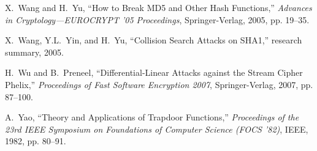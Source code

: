 \documentclass[11pt,twoside]{article}
\begin{document}
{\begin{thebibliography}{19}
 X.~Wang and H.~Yu, ``How to Break MD5 and Other Hash Functions,'' {\it Advances in Cryptology---EUROCRYPT '05 Proceedings}, Springer-Verlag, 2005, pp. 19--35.

 X.~Wang, Y.L.~Yin, and H.~Yu, ``Collision Search Attacks on SHA1,'' research summary, 2005.

 H.~Wu and B.~Preneel, ``Differential-Linear Attacks against the Stream Cipher Phelix,'' {\it Proceedings of Fast Software Encryption 2007}, Springer-Verlag, 2007, pp. 87--100.

  A.~Yao, ``Theory and Applications of Trapdoor Functions,'' {\it Proceedings of the 23rd IEEE Symposium on Foundations of Computer Science (FOCS '82)}, IEEE, 1982, pp. 80--91.

\end{thebibliography}
}
\end{document}

